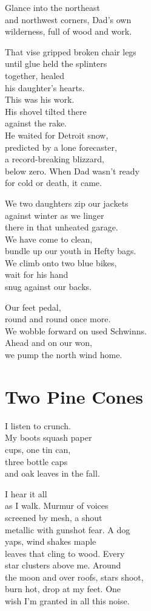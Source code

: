 \documentclass[twoside,10pt]{book}
\begin{document}
Glance into the northeast\\
and northwest corners, Dad's own\\
wilderness, full of wood and work.

That vise gripped broken chair legs\\
until glue held the splinters\\
together, healed\\
his daughter's hearts.\\
This was his work.\\
His shovel tilted there\\
against the rake.\\
He waited for Detroit snow,\\
predicted by a lone forecaster,\\
a record-breaking blizzard,\\
below zero. When Dad wasn't ready\\
for cold or death, it came.

We two daughters zip our jackets\\
against winter as we linger\\
there in that unheated garage.\\
We have come to clean,\\
bundle up our youth in Hefty bags.\\
We climb onto two blue bikes,\\
wait for his hand\\
snug against our backs.

Our feet pedal,\\
round and round once more.\\
We wobble forward on used Schwinns.\\
Ahead and on our won,\\
we pump the north wind home.


\clearpage
\section{Two Pine Cones}

I listen to crunch.\\
My boots squash paper\\
cups, one tin can,\\
three bottle caps\\
and oak leaves in the fall.

I hear it all\\
as I walk. Murmur of voices\\
screened by mesh, a shout\\
metallic with gunshot fear. A dog\\
yaps, wind shakes maple\\
leaves that cling to wood. Every\\
star clusters above me. Around\\
the moon and over roofs, stars shoot,\\
burn hot, drop at my feet. One\\
wish I'm granted in all this noise.
\end{document}
